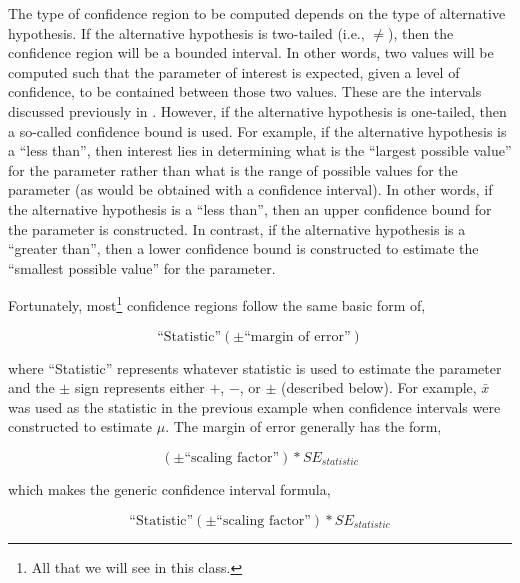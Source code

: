 \documentclass[10pt,openany]{book}\usepackage[]{graphicx}\usepackage[]{color}
\begin{document}
The type of confidence region to be computed depends on the type of alternative hypothesis.  If the alternative hypothesis is two-tailed (i.e., $\neq$), then the confidence region will be a bounded interval.  In other words, two values will be computed such that the parameter of interest is expected, given a level of confidence, to be contained between those two values.  These are the intervals discussed previously in .  However, if the alternative hypothesis is one-tailed, then a so-called confidence bound is used.  For example, if the alternative hypothesis is a ``less than'', then interest lies in determining what is the ``largest possible value'' for the parameter rather than what is the range of possible values for the parameter (as would be obtained with a confidence interval).  In other words, if the alternative hypothesis is a ``less than'', then an upper confidence bound for the parameter is constructed.  In contrast, if the alternative hypothesis is a ``greater than'', then a lower confidence bound is constructed to estimate the ``smallest possible value'' for the parameter.



Fortunately, most\footnote{All that we will see in this class.} confidence regions follow the same basic form of, 

  \[ \text{``Statistic''} (\pm \text{``margin of error''}) \]

where ``Statistic'' represents whatever statistic is used to estimate the parameter and the $\pm$ sign represents either $+$, $-$, or $\pm$ (described below).  For example, $\bar{x}$ was used as the statistic in the previous example when confidence intervals were constructed to estimate $\mu$.  The margin of error generally has the form,

  \[ (\pm \text{``scaling factor''}) * SE_{statistic} \]

which makes the generic confidence interval formula,

  \[ \text{``Statistic''} (\pm \text{``scaling factor''}) * SE_{statistic} \]
\end{document}
